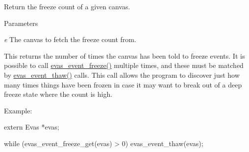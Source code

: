 Return the freeze count of a given canvas. 


\begin{DoxyParams}{Parameters}
\item[{\em e}]The canvas to fetch the freeze count from.\end{DoxyParams}
This returns the number of times the canvas has been told to freeze events. It is possible to call \hyperlink{group__Evas__Event__Freezing__Group_ga45fee3a26820b56527e434f6173c345e}{evas\_\-event\_\-freeze()} multiple times, and these must be matched by \hyperlink{group__Evas__Event__Freezing__Group_ga4f08e6b3eece51bf285f1226629924e1}{evas\_\-event\_\-thaw()} calls. This call allows the program to discover just how many times things have been frozen in case it may want to break out of a deep freeze state where the count is high.

Example: 
\begin{DoxyCode}
 extern Evas *evas;

 while (evas_event_freeze_get(evas) > 0) evas_event_thaw(evas);
\end{DoxyCode}
 